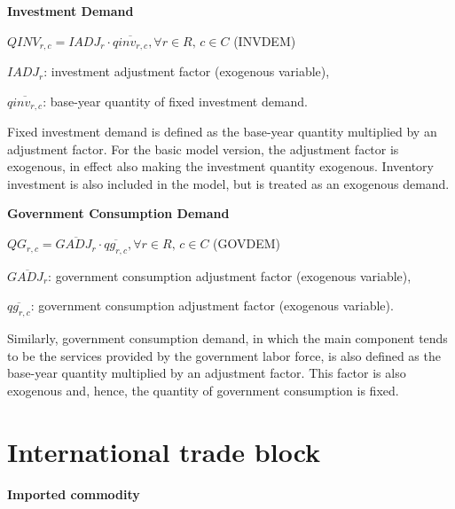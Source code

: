 \documentclass[10pt,a4paper,titlepage,dvipdfmx]{book}
\begin{document}
\begin{flushleft}\textbf{Investment Demand}\end{flushleft}


\begin{center}$QINV_{r,c}=IADJ_{r}\cdot \overline{qinv_{r,c}},\forall r\in R,\,c\in C$ (INVDEM)
\end{center}

\begin{flushleft}
$IADJ_{r}$: investment adjustment factor (exogenous variable),

$\overline{qinv_{r,c}}$: base-year quantity of fixed investment demand.
\end{flushleft}

Fixed investment demand is defined as the base-year quantity multiplied by an adjustment factor. For the basic model version, the adjustment factor is exogenous, in effect also making the investment quantity exogenous. Inventory investment is also included in the model, but is treated as an exogenous demand.

\begin{flushleft}\textbf{Government Consumption Demand}\end{flushleft}


\begin{center}$QG_{r,c}=\overline{GADJ_{r}}\cdot \overline{qg_{r,c}},\forall r\in R,\,c\in C$ (GOVDEM)
\end{center}

\begin{flushleft}
$\overline{GADJ_{r}}$: government consumption adjustment factor (exogenous variable),

$\overline{qg_{r,c}}$: government consumption adjustment factor (exogenous variable).
\end{flushleft}

Similarly, government consumption demand, in which the main component tends to be the services provided by the government labor force, is also defined as the base-year quantity multiplied by an adjustment factor. This factor is also exogenous and, hence, the quantity of government consumption is fixed.

\section{\label{sec:IntTraBlo}International trade block}

\begin{flushleft}\textbf{Imported commodity}\end{flushleft}
\end{document}
